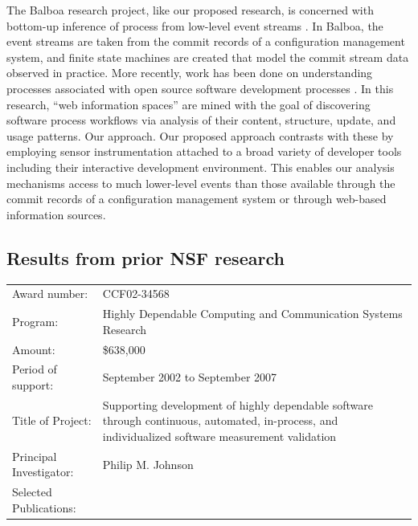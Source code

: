 The Balboa research project, like our proposed research, is concerned with
bottom-up inference of process from low-level event streams \cite{Cook:95}. In
Balboa, the event streams are taken from the commit records of a
configuration management system, and finite state machines are created that
model the commit stream data observed in practice.  More recently, work has
been done on understanding processes associated with open source software
development processes \cite{Jensen:05}. In this research, ``web information
spaces'' are mined with the goal of discovering software process workflows
via analysis of their content, structure, update, and usage patterns. Our
approach.  Our proposed approach contrasts with these by employing sensor
instrumentation attached to a broad variety of developer tools including
their interactive development environment. This enables our analysis
mechanisms access to much lower-level events than those available through
the commit records of a configuration management system or through
web-based information sources.


\subsection{Results from prior NSF research}

\small
\begin{tabular}{lp{4.5in}}

Award number: & CCF02-34568 \\
Program: & Highly Dependable Computing and Communication Systems Research\\
Amount: & \$638,000 \\
Period of support: & September 2002 to September 2007 \\
Title of Project: & Supporting development of highly dependable software through
continuous, automated, in-process, and individualized software measurement validation \\
Principal Investigator: & Philip M. Johnson \\
Selected Publications: & \cite{csdl2-04-22,csdl2-04-13,csdl2-04-11,csdl2-03-12,
csdl2-02-07,csdl2-03-07,csdl2-04-02,csdl2-04-04,csdl2-04-06}
\end{tabular} \\ %
\normalsize

\medskip

